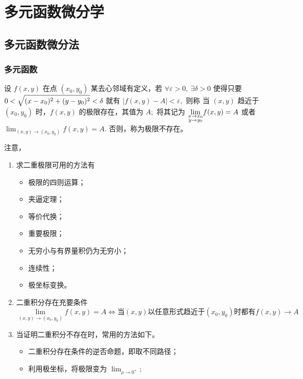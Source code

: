 \chapter{多元函数微分学}

\section{多元函数微分法}

\subsection{多元函数}

\begin{Def}[二元函数极限]

    设 $ f(x,y) $ 在点 $ (x_0,y_0) $ 某去心邻域有定义，\newline 若 $ \forall \varepsilon > 0,\ \exists \delta > 0 $ 
    使得只要 $ 0 < \displaystyle\sqrt{(x-x_0)^2+(y-y_0)^2}<\delta $ 就有 $ |f(x,y)-A|<\varepsilon, $ \newline 则称
    当 $ (x,y) $ 趋近于 $ (x_0,y_0) $ 时，$ f(x,y) $ 的极限存在，其值为 $ A; $ 
    \newline 将其记为
    $ {\displaystyle\lim_{\begin{subarray}{c}
        x\rightarrow x_0\\y\rightarrow y_0
    \end{subarray}}}f(x,y) = A $ 或者 $ {\displaystyle\lim_{(x,y)\rightarrow (x_0,y_0)}}f(x,y) = A. $ 
    否则，称为极限不存在。
\end{Def}

注意，\begin{enumerate}
    \item 求二重极限可用的方法有
    \begin{itemize}
        \item 极限的四则运算；
        \item 夹逼定理；
        \item 等价代换；
        \item 重要极限；
        \item 无穷小与有界量积仍为无穷小；
        \item 连续性；
        \item 极坐标变换。
    \end{itemize}
    \item 二重积分存在充要条件$$
        {\displaystyle\lim_{(x,y)\rightarrow (x_0,y_0)}}f(x,y) = A \Leftrightarrow
        \textrm{当} (x,y) \textrm{以任意形式趋近于} (x_0,y_0) \textrm{时都有} f(x,y)\rightarrow A
    $$ 
    \item 当证明二重积分不存在时，常用的方法如下。
    \begin{itemize}
        \item 二重积分存在条件的逆否命题，即取不同路径；
        \item 利用极坐标，将极限变为 $ {\displaystyle\lim_{\rho\rightarrow 0^+}}; $ 
    \end{itemize}
\end{enumerate}

